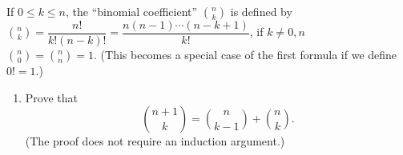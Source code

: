 \begin{pr} \label{2.3} %
  If $0 \leq k \leq n$, the ``binomial coefficient''
  $\displaystyle\binom{n}{k}$ is defined by
  $\displaystyle\binom{n}{k} = \dfrac{n!}{k!(n-k)!}
  = \dfrac{n(n-1)\cdots(n-k+1)}{k!}$, if $k\neq0,n$ \\
  $\displaystyle\binom{n}{0} = \binom{n}{n} = 1$.
  (This becomes a special case of the first formula
  if we define $0! = 1$.)
  \begin{enumerate}[label=(\alph*)]
    \item \label{2.3:a}
    Prove that
    \begin{equation*}
      \binom{n+1}{k} = \binom{n}{k-1} + \binom{n}{k}.
    \end{equation*}
    (The proof does not require an induction argument.)


\end{enumerate}
\end{pr}
